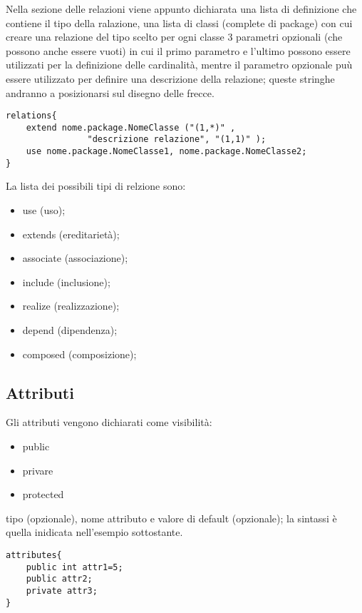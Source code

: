 Nella sezione delle relazioni
viene appunto dichiarata una lista di definizione che contiene il tipo della 
ralazione, una lista di classi (complete di package) 
con cui creare una relazione del tipo scelto
per ogni classe 3 parametri opzionali (che possono anche essere vuoti) in cui
il primo parametro e l'ultimo possono essere utilizzati per la definizione delle
cardinalità, mentre il parametro opzionale puù essere utilizzato per definire
una descrizione della relazione; queste stringhe andranno a posizionarsi sul 
disegno delle frecce.

\begin{lstlisting}[caption={Dichiarazione di classe}, style={model}]
relations{
	extend nome.package.NomeClasse ("(1,*)" , 
				"descrizione relazione", "(1,1)" );
	use nome.package.NomeClasse1, nome.package.NomeClasse2;
}
\end{lstlisting}

La lista dei possibili tipi di relzione sono:
\begin{itemize}
  \item{use (uso);}
  \item{extends (ereditarietà);}
  \item{associate (associazione);}
  \item{include (inclusione);}
  \item{realize (realizzazione);}
  \item{depend (dipendenza);}
  \item{composed (composizione);}
\end{itemize}

\subsection{Attributi}

Gli attributi vengono dichiarati come visibilità:
\begin{itemize}
  \item public
  \item privare
  \item protected
\end{itemize}

tipo (opzionale), nome attributo e valore di default (opzionale); la sintassi è
quella inidicata nell'esempio sottostante.

\begin{lstlisting}[caption={Dichiarazione di classe}, style={model}]
attributes{
	public int attr1=5;
	public attr2;
	private attr3;
}
\end{lstlisting}

